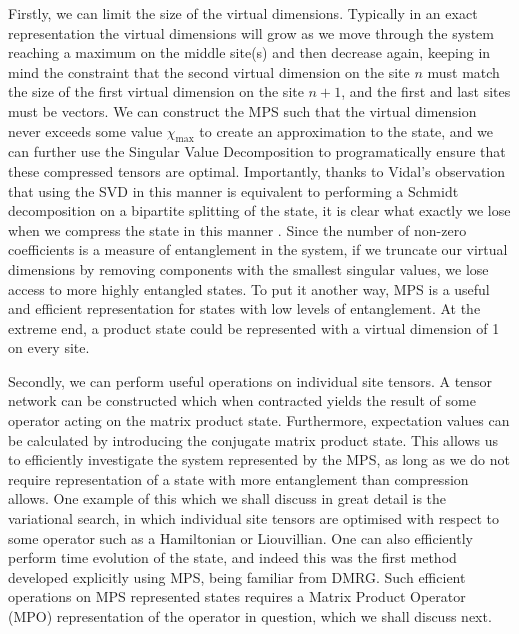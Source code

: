  Firstly, we can limit the size of the virtual dimensions. Typically in an exact representation the virtual dimensions will grow as we move through the system reaching a maximum on the middle site(s) and then decrease again, keeping in mind the constraint that the second virtual dimension on the site \(n\) must match the size of the first virtual dimension on the site \(n+1\), and the first and last sites must be vectors. We can construct the MPS such that the virtual dimension never exceeds some value \(\chi_{\mathrm{max}}\) to create an approximation to the state, and we can further use the Singular Value Decomposition to programatically ensure that these compressed tensors are optimal. Importantly, thanks to Vidal's observation that using the SVD in this manner is equivalent to performing a Schmidt decomposition on a bipartite splitting of the state, it is clear what exactly we lose when we compress the state in this manner \cite{Vidal03}. Since the number of non-zero coefficients is a measure of entanglement in the system, if we truncate our virtual dimensions by removing components with the smallest singular values, we lose access to more highly entangled states. To put it another way, MPS is a useful and efficient representation for states with low levels of entanglement. At the extreme end, a product state could be represented with a virtual dimension of 1 on every site. 
 
 Secondly, we can perform useful operations on individual site tensors. A tensor network can be constructed which when contracted yields the result of some operator acting on the matrix product state. Furthermore, expectation values can be calculated by introducing the conjugate matrix product state. This allows us to efficiently investigate the system represented by the MPS, as long as we do not require representation of a state with more entanglement than compression allows. One example of this which we shall discuss in great detail is the variational search, in which individual site tensors are optimised with respect to some operator such as a Hamiltonian or Liouvillian. One can also efficiently perform time evolution of the state, and indeed this was the first method developed explicitly using MPS, being familiar from DMRG. Such efficient operations on MPS represented states requires a Matrix Product Operator (MPO) representation of the operator in question, which we shall discuss next.  
 
